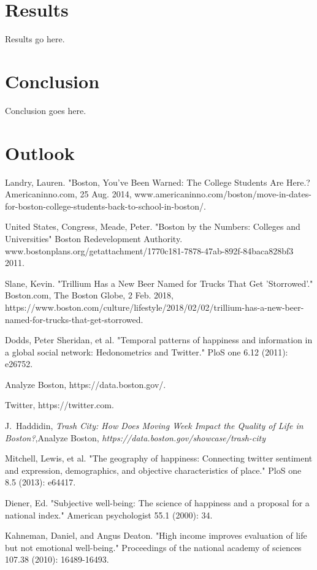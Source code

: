 \documentclass[journal, a4paper]{IEEEtran}
\begin{document}
\section{Results}
Results go here.
\section{Conclusion}
Conclusion goes here.
\section{Outlook}

\begin{thebibliography}{5}

    Landry, Lauren. "Boston, You've Been Warned: The College Students Are Here.? Americaninno.com, 25 Aug. 2014, www.americaninno.com/boston/move-in-dates-for-boston-college-students-back-to-school-in-boston/.
    
    United States, Congress, Meade, Peter. "Boston by the Numbers: Colleges and Universities" Boston Redevelopment Authority. www.bostonplans.org/getattachment/1770c181-7878-47ab-892f-84baca828bf3 2011.
    
    Slane, Kevin. "Trillium Has a New Beer Named for Trucks That Get 'Storrowed'." Boston.com, The Boston Globe, 2 Feb. 2018, https://www.boston.com/culture/lifestyle/2018/02/02/trillium-has-a-new-beer-named-for-trucks-that-get-storrowed.
    
    Dodds, Peter Sheridan, et al. "Temporal patterns of happiness and information in a global social network: Hedonometrics and Twitter." PloS one 6.12 (2011): e26752.
    
    Analyze Boston, https://data.boston.gov/.

   Twitter, https://twitter.com.
   
   J.~Haddidin,  \emph{Trash City: How Does Moving Week Impact the Quality of Life in Boston?},\relax Analyze Boston,  \emph{https://data.boston.gov/showcase/trash-city}
   
   Mitchell, Lewis, et al. "The geography of happiness: Connecting twitter sentiment and expression, demographics, and objective characteristics of place." PloS one 8.5 (2013): e64417.
   
   Diener, Ed. "Subjective well-being: The science of happiness and a proposal for a national index." American psychologist 55.1 (2000): 34.
   
   Kahneman, Daniel, and Angus Deaton. "High income improves evaluation of life but not emotional well-being." Proceedings of the national academy of sciences 107.38 (2010): 16489-16493.
   
  


\end{thebibliography}

\end{document}
